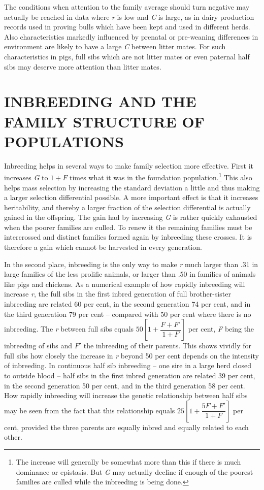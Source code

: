 The conditions when attention to the family average should turn
negative may actually be reached in data where \textit{r} is low and \textit{C} is large,
as in dairy production records used in proving bulls which have been
kept and used in different herds. Also characteristics markedly influenced
by prenatal or pre-weaning differences in environment are likely
to have a large \textit{C} between litter mates. For such characteristics in pigs,
full sibs which are not litter mates or even paternal half sibs may
deserve more attention than litter mates.

\section*{INBREEDING AND THE FAMILY STRUCTURE OF POPULATIONS}

Inbreeding helps in several ways to make family selection more
effective. First it increases \textit{G} to $1 + F$ times what it was in the
foundation population.\footnote{The increase will generally be somewhat more
than this if there is much dominance or epistasis. But \textit{G} may actually
decline if enough of the poorest families are culled while the inbreeding
is being done.} This also helps mass selection by increasing the standard
deviation a little and thus making a larger selection differential
possible. A more important effect is that it increases heritability, and
thereby a larger fraction of the selection differential is actually gained
in the offspring. The gain had by increasing \textit{G} is rather quickly
exhausted when the poorer families are culled. To renew it the remaining
families must be intercrossed and distinct families formed again by
inbreeding these crosses. It is therefore a gain which cannot be harvested
in every generation.

In the second place, inbreeding is the only way to make \textit{r} much
larger than .31 in large families of the less prolific animals, or larger
than .50 in families of animals like pigs and chickens. As a numerical
example of how rapidly inbreeding will increase \textit{r}, the full sibs in the
first inbred generation of full brother-sister inbreeding are related 60
per cent, in the second generation 74 per cent, and in the third generation
79 per cent -- compared with 50 per cent where there is no inbreeding.
The \textit{r} between full sibs equals $50\left[1 + \dfrac{F + F'}{1 + F}\right]$ per cent,
\textit{F} being the inbreeding of sibs and $F'$ the inbreeding of their parents. This
shows vividly for full sibs how closely the increase in \textit{r} beyond 50 per
cent depends on the intensity of inbreeding. In continuous half sib
inbreeding -- one sire in a large herd closed to outside blood -- half sibs
in the first inbred generation are related 39 per cent, in the second generation
50 per cent, and in the third generation 58 per cent. How
rapidly inbreeding will increase the genetic relationship between
half sibs may be seen from the fact that this relationship equals
$25\left[1 + \dfrac{5F + F'}{1 + F}\right]$ per cent, provided the three parents
are equally inbred and equally related to each other.

